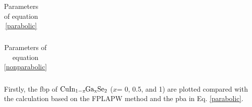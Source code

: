 \documentclass[a4paper, 12pt, titlepage,oneside,drop]{kthesis}
\begin{document}
\begin{table}[ht]
\caption{Parameters of equation \ref{parabolic}}
\begin{center}
\begin{tabular}{ccc}
\end{tabular}
\end{center}
\label{rd1}
\end{table}

\begin{table}[ht]
\caption{Parameters of equation \ref{nonparabolic}}
\begin{center}
\begin{tabular}{ccc}
\end{tabular}
\end{center}
\label{rd2}
\end{table}


 \newpage

Firstly, the fbp of $\mathrm { CuIn_{1-\textit{x}}Ga_{x}Se_2}$ ($x$= 0, 0.5, and 1) are plotted compared with the calculation based on the FPLAPW method and the pba in 
Eq. \ref{parabolic}.
\end{document}
